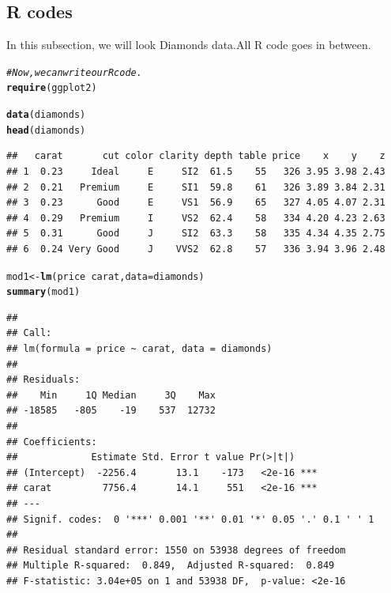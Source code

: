 \documentclass{article}\usepackage[]{graphicx}\usepackage[]{color}
\makeatletter
\newcommand{\hlcom}[1]{\textcolor[rgb]{0.678,0.584,0.686}{\textit{#1}}}%
\newcommand{\hlopt}[1]{\textcolor[rgb]{0,0,0}{#1}}%
\newcommand{\hlstd}[1]{\textcolor[rgb]{0.345,0.345,0.345}{#1}}%
\newcommand{\hlkwb}[1]{\textcolor[rgb]{0.69,0.353,0.396}{#1}}%
\newcommand{\hlkwc}[1]{\textcolor[rgb]{0.333,0.667,0.333}{#1}}%
\newcommand{\hlkwd}[1]{\textcolor[rgb]{0.737,0.353,0.396}{\textbf{#1}}}%
\newenvironment{kframe}{%
 \def\at@end@of@kframe{}%
 \ifinner\ifhmode%
  \def\at@end@of@kframe{\end{minipage}}%
  \begin{minipage}{\columnwidth}%
 \fi\fi%
 \def\FrameCommand##1{\hskip\@totalleftmargin \hskip-\fboxsep
 \colorbox{shadecolor}{##1}\hskip-\fboxsep
     \hskip-\linewidth \hskip-\@totalleftmargin \hskip\columnwidth}%
 \MakeFramed {\advance\hsize-\width
   \@totalleftmargin\z@ \linewidth\hsize
   \@setminipage}}%
 {\par\unskip\endMakeFramed%
 \at@end@of@kframe}
\newenvironment{knitrout}{}{} %
\makeatother
\begin{document}
\subsection{R codes}
In this subsection, we will look Diamonds data.All R code goes in between.
\begin{knitrout}
\color{fgcolor}\begin{kframe}
\begin{alltt}
\hlcom{#Now, we can write our R code.}
\hlkwd{require} \hlstd{(ggplot2)}
\end{alltt}


{\ttfamily\noindent\itshape\color{messagecolor}{\#\# Loading required package: ggplot2}}

{\ttfamily\noindent\color{warningcolor}{\#\# Warning: package 'ggplot2' was built under R version 3.0.3}}\begin{alltt}
\hlkwd{data}\hlstd{(diamonds)}
\hlkwd{head}\hlstd{(diamonds)}
\end{alltt}
\begin{verbatim}
##   carat       cut color clarity depth table price    x    y    z
## 1  0.23     Ideal     E     SI2  61.5    55   326 3.95 3.98 2.43
## 2  0.21   Premium     E     SI1  59.8    61   326 3.89 3.84 2.31
## 3  0.23      Good     E     VS1  56.9    65   327 4.05 4.07 2.31
## 4  0.29   Premium     I     VS2  62.4    58   334 4.20 4.23 2.63
## 5  0.31      Good     J     SI2  63.3    58   335 4.34 4.35 2.75
## 6  0.24 Very Good     J    VVS2  62.8    57   336 3.94 3.96 2.48
\end{verbatim}
\begin{alltt}
\hlstd{mod1} \hlkwb{<-} \hlkwd{lm}\hlstd{(price} \hlopt{~} \hlstd{carat,} \hlkwc{data} \hlstd{= diamonds)}
\hlkwd{summary}\hlstd{(mod1)}
\end{alltt}
\begin{verbatim}
## 
## Call:
## lm(formula = price ~ carat, data = diamonds)
## 
## Residuals:
##    Min     1Q Median     3Q    Max 
## -18585   -805    -19    537  12732 
## 
## Coefficients:
##             Estimate Std. Error t value Pr(>|t|)    
## (Intercept)  -2256.4       13.1    -173   <2e-16 ***
## carat         7756.4       14.1     551   <2e-16 ***
## ---
## Signif. codes:  0 '***' 0.001 '**' 0.01 '*' 0.05 '.' 0.1 ' ' 1
## 
## Residual standard error: 1550 on 53938 degrees of freedom
## Multiple R-squared:  0.849,	Adjusted R-squared:  0.849 
## F-statistic: 3.04e+05 on 1 and 53938 DF,  p-value: <2e-16
\end{verbatim}
\end{kframe}
\end{knitrout}
\end{document}
